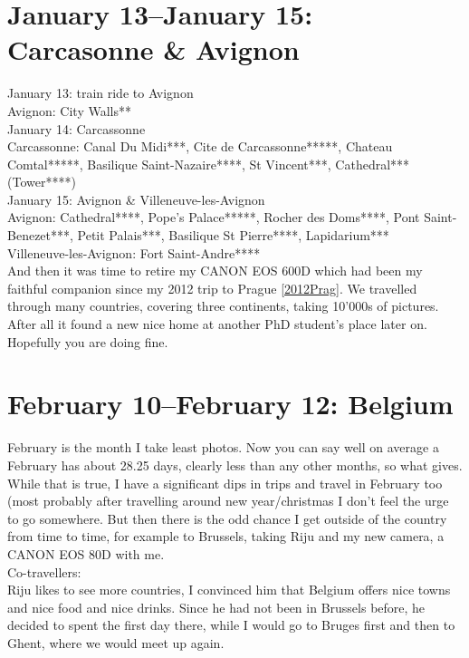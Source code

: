 \section{January 13--January 15: Carcasonne \& Avignon}
\label{2017:Provence}

January 13: train ride to Avignon\\
Avignon: City Walls**\\

January 14: Carcassonne\\
Carcassonne: Canal Du Midi***, Cite de Carcassonne*****, Chateau Comtal*****, Basilique Saint-Nazaire****, St Vincent***, Cathedral*** (Tower****)\\

January 15: Avignon \& Villeneuve-les-Avignon\\
Avignon: Cathedral****, Pope's Palace*****, Rocher des Doms****, Pont Saint-Benezet***, Petit Palais***, Basilique St Pierre****, Lapidarium***\\
Villeneuve-les-Avignon: Fort Saint-Andre****\\

And then it was time to retire my CANON EOS 600D which had been my faithful companion since my 2012 trip to Prague \ref{2012Prag}. We travelled through many countries, covering three continents, taking 10'000s of pictures. After all it found a new nice home at another PhD student's place later on. Hopefully you are doing fine. 

\section{February 10--February 12: Belgium}
\label{Belgium2017}

February is the month I take least photos. Now you can say well on average a February has about 28.25 days, clearly less than any other months, so what gives. While that is true, I have a significant dips in trips and travel in February too (most probably after travelling around new year/christmas I don't feel the urge to go somewhere. But then there is the odd chance I get outside of the country from time to time, for example to Brussels, taking Riju and my new camera, a CANON EOS 80D with me.\\

Co-travellers:\\
Riju likes to see more countries, I convinced him that Belgium offers nice towns and nice food and nice drinks. Since he had not been in Brussels before, he decided to spent the first day there, while I would go to Bruges first and then to Ghent, where we would meet up again.\\

